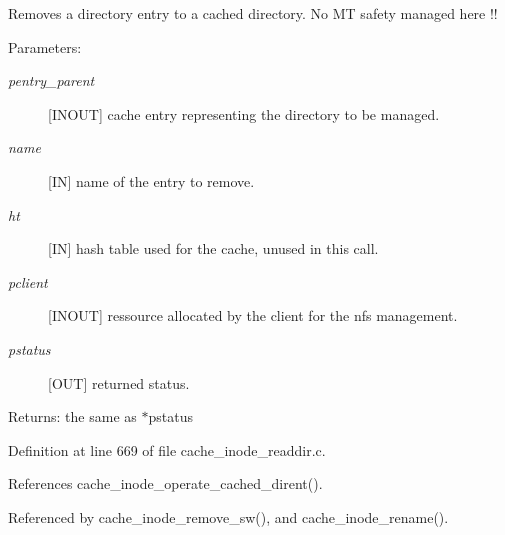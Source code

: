Removes a directory entry to a cached directory. No MT safety managed here !!

\begin{Desc}
\item[Parameters:]
\begin{description}
\item[{\em pentry\_\-parent}][INOUT] cache entry representing the directory to be managed. \item[{\em name}][IN] name of the entry to remove. \item[{\em ht}][IN] hash table used for the cache, unused in this call. \item[{\em pclient}][INOUT] ressource allocated by the client for the nfs management. \item[{\em pstatus}][OUT] returned status.\end{description}
\end{Desc}
\begin{Desc}
\item[Returns:]the same as $\ast$pstatus \end{Desc}


Definition at line 669 of file cache\_\-inode\_\-readdir.c.

References cache\_\-inode\_\-operate\_\-cached\_\-dirent().

Referenced by cache\_\-inode\_\-remove\_\-sw(), and cache\_\-inode\_\-rename().